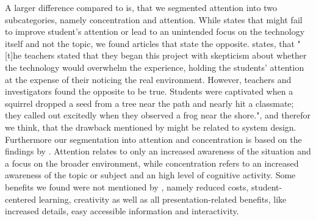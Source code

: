 A larger difference compared to \cite{Radu.2014} is, that we segmented attention into two subcategories, namely concentration and attention. While \cite{Radu.2014} states that \AR \apps might fail to improve student's attention or lead to an unintended focus on the technology itself and not the topic\autocite[cf.][314]{Radu.2014}, we found articles that state the opposite. \cite{Kamarainen.2013} states, that "[t]he teachers stated that they began this project with skepticism about whether the technology would overwhelm the experience, holding the students’ attention at the expense of their noticing the real environment. However, teachers and investigators found the opposite to be true. Students were captivated when a squirrel dropped a seed from a tree near the path and nearly hit a classmate; they called out excitedly when they observed a frog near the shore."\autocite[554]{Kamarainen.2013}, and therefor we think, that the drawback mentioned by \cite{Radu.2014} might be related to system design. Furthermore our segmentation into attention and concentration is based on the findings by \cite{Kamarainen.2013}. Attention relates to only an increased awareness of the situation and a focus on the broader environment, while concentration refers to an increased awareness of the topic or subject and an high level of cognitive activity.
%
%
% 
%
Some benefits we found were not mentioned by \cite{Radu.2014}, namely reduced costs, student-centered learning, creativity as well as all presentation-related benefits, like increased details, easy accessible information and interactivity.\\
%
